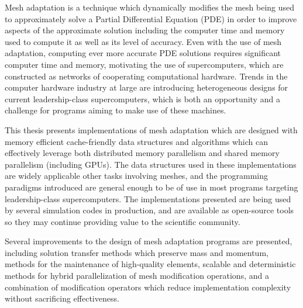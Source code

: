 

Mesh adaptation is a technique which dynamically modifies the
mesh being used to approximately solve a Partial Differential
Equation (PDE) in order to improve aspects of the approximate solution
including the computer time and memory used to compute it
as well as its level of accuracy.
Even with the use of mesh adaptation, computing ever more accurate
PDE solutions requires significant computer time and memory,
motivating the use of supercomputers, which are constructed as
networks of cooperating computational hardware.
Trends in the computer hardware industry at large are introducing
heterogeneous designs for current leadership-class supercomputers,
which is both an opportunity and a challenge for programs
aiming to make use of these machines.

This thesis presents implementations of mesh adaptation
which are designed with memory efficient cache-friendly
data structures and algorithms which can effectively leverage
both distributed memory parallelism and shared memory
parallelism (including GPUs).
The data structures used in these implementations are widely
applicable other tasks involving meshes, and the programming
paradigms introduced are general enough to be of use in most
programs targeting leadership-class supercomputers.
The implementations presented are being used by
several simulation codes in production, and are available
as open-source tools so they may continue providing value
to the scientific community.

Several improvements to the design of mesh adaptation programs
are presented, including solution transfer methods which
preserve mass and momentum, methods for the maintenance of
high-quality elements, scalable and deterministic methods
for hybrid parallelization of mesh modification operations,
and a combination of modification operators which reduce
implementation complexity without sacrificing effectiveness.
